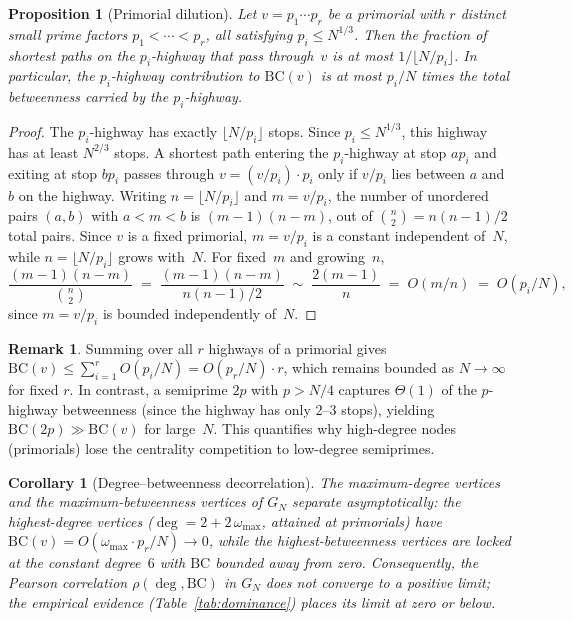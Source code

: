 \documentclass[11pt]{article}
\theoremstyle{plain}
\newtheorem{proposition}[theorem]{Proposition}
\newtheorem{corollary}[theorem]{Corollary}
\theoremstyle{definition}
\newtheorem{remark}[theorem]{Remark}
\newcommand{\BC}{\mathrm{BC}}
\begin{document}
\begin{proposition}[Primorial dilution]\label{prop:dilution}
Let $v = p_1 \cdots p_r$ be a primorial with $r$ distinct small prime factors
$p_1 < \cdots < p_r$, all satisfying $p_i \le N^{1/3}$.
Then the fraction of shortest paths on the $p_i$-highway that pass through~$v$
is at most $1 / \lfloor N / p_i \rfloor$.
In particular, the $p_i$-highway contribution to $\BC(v)$ is at most
$p_i / N$ times the total betweenness carried by the $p_i$-highway.
\end{proposition}

\begin{proof}
The $p_i$-highway has exactly $\lfloor N / p_i \rfloor$ stops.
Since $p_i \le N^{1/3}$, this highway has at least $N^{2/3}$ stops.
A shortest path entering the $p_i$-highway at stop $ap_i$ and exiting
at stop $bp_i$ passes through $v = (v/p_i) \cdot p_i$ only if $v/p_i$
lies between $a$ and $b$ on the highway. Writing $n = \lfloor N/p_i \rfloor$
and $m = v/p_i$, the number of unordered pairs $(a, b)$ with $a < m < b$
is $(m - 1)(n - m)$, out of $\binom{n}{2} = n(n-1)/2$ total pairs.
Since $v$ is a fixed primorial, $m = v/p_i$ is a constant independent of~$N$,
while $n = \lfloor N/p_i \rfloor$ grows with~$N$. For fixed~$m$ and growing~$n$,
\[
\frac{(m-1)(n-m)}{\binom{n}{2}}
\;=\; \frac{(m-1)(n-m)}{n(n-1)/2}
\;\sim\; \frac{2(m-1)}{n}
\;=\; O(m/n)
\;=\; O(p_i / N),
\]
since $m = v/p_i$ is bounded independently of~$N$.
\end{proof}

\begin{remark}
Summing over all $r$ highways of a primorial gives
$\BC(v) \le \sum_{i=1}^{r} O(p_i / N) = O(p_r / N) \cdot r$,
which remains bounded as $N \to \infty$ for fixed $r$.
In contrast, a semiprime $2p$ with $p > N/4$ captures $\Theta(1)$ of the
$p$-highway betweenness (since the highway has only $2$--$3$ stops),
yielding $\BC(2p) \gg \BC(v)$ for large~$N$.
This quantifies why high-degree nodes (primorials) lose the centrality
competition to low-degree semiprimes.
\end{remark}

\begin{corollary}[Degree--betweenness decorrelation]\label{cor:decorrelation}
The maximum-degree vertices and the maximum-betweenness vertices of $G_N$ separate asymptotically:
the highest-degree vertices ($\deg = 2 + 2\,\omega_{\max}$, attained at primorials) have
$\BC(v) = O(\omega_{\max} \cdot p_r / N) \to 0$, while the highest-betweenness vertices are locked
at the constant degree~$6$ with $\BC$ bounded away from zero. Consequently, the Pearson correlation
$\rho(\deg, \BC)$ in $G_N$ does not converge to a positive limit; the empirical evidence
(Table~\ref{tab:dominance}) places its limit at zero or below.
\end{corollary}
\end{document}
